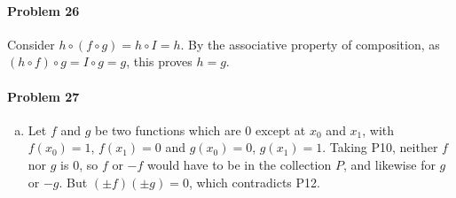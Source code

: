 \documentclass{article}
\begin{document}
\paragraph{Problem 26} Consider $h \circ (f \circ g) = h \circ I = h$. By the
associative property of composition, as $(h \circ f) \circ g = I \circ g = g$,
this proves $h = g$.

\paragraph{Problem 27}
\begin{enumerate}[(c)]
  \item Let $f$ and $g$ be two functions which are 0 except at $x_0$ and $x_1$,
    with $f(x_0) = 1$, $f(x_1) = 0$ and $g(x_0) = 0$, $g(x_1) = 1$. Taking P10,
    neither $f$ nor $g$ is 0, so $f$ or $-f$ would have to be in the collection
    $P$, and likewise for $g$ or $-g$. But $(\pm f)(\pm g) = 0$, which
    contradicts P12.
\end{enumerate}
\end{document}
